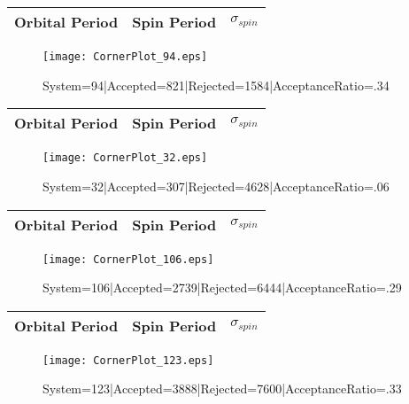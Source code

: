 \documentclass[10pt]{article}
\begin{document}
\begin{center}
        \begin{tabular}{|c|c|c|}
        \hline
Orbital Period & Spin Period & $\sigma_{spin}$ \\
 \hline
        \end{tabular}
        \end{center}
\begin{figure}[h] 
        \texttt{[image: CornerPlot\_94.eps]}
        \caption{System=94|Accepted=821|Rejected=1584|AcceptanceRatio=.34}
        \label{S94}
        \centering
        \end{figure}
\begin{center}
        \begin{tabular}{|c|c|c|}
        \hline
Orbital Period & Spin Period & $\sigma_{spin}$ \\
 \hline
        \end{tabular}
        \end{center}
\begin{figure}[h] 
        \texttt{[image: CornerPlot\_32.eps]}
        \caption{System=32|Accepted=307|Rejected=4628|AcceptanceRatio=.06}
        \label{S32}
        \centering
        \end{figure}
\begin{center}
        \begin{tabular}{|c|c|c|}
        \hline
Orbital Period & Spin Period & $\sigma_{spin}$ \\
 \hline
        \end{tabular}
        \end{center}
\begin{figure}[h] 
        \texttt{[image: CornerPlot\_106.eps]}
        \caption{System=106|Accepted=2739|Rejected=6444|AcceptanceRatio=.29}
        \label{S106}
        \centering
        \end{figure}
\begin{center}
        \begin{tabular}{|c|c|c|}
        \hline
Orbital Period & Spin Period & $\sigma_{spin}$ \\
 \hline
        \end{tabular}
        \end{center}
\begin{figure}[h] 
        \texttt{[image: CornerPlot\_123.eps]}
        \caption{System=123|Accepted=3888|Rejected=7600|AcceptanceRatio=.33}
        \label{S123}
        \centering
        \end{figure}
\end{document}

